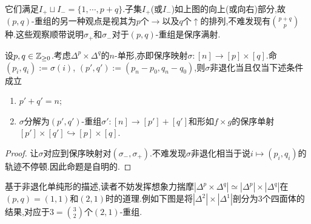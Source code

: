 它们满足$I_+ \sqcup I_- = \{1,\cdots,p+q\}$.子集$I_+$(或$I_-$)如上图的向上(或向右)部分,故$(p,q)$-重组的另一种观点是视其为$p$个$\to$以及$q$个$\uparrow$的排列,不难发现有${p+q}\choose{p}$种.这些观察顺带说明$\sigma_{+}$和$\sigma_{-}$对于$(p,q)$-重组是保序满射.
\begin{proposition}
    设$p,q\in \mathbb{Z}_{\geq 0}$.考虑$\Delta^p \times \Delta^q$的$n$-单形,亦即保序映射$\sigma : [n] \to [p]\times [q]$.命$(p_i,q_i):=\sigma(i)$, $(p',q'):= (p_n-p_0,q_n-q_0)$,则$\sigma$非退化当且仅当下述条件成立
    \begin{enumerate}
        \item $p'+q' = n$;
        \item $\sigma$分解为$(p',q')$-重组$\sigma' : [n] \to [p']+[q']$和形如$f\times g$的保序单射$[p']\times [q'] \hookrightarrow [p]\times [q]$.
    \end{enumerate}
\end{proposition}
\begin{proof}
    让$\sigma$对应到保序映射对$(\sigma_-,\sigma_+)$.不难发现$\sigma$非退化相当于说$i\mapsto (p_i,q_i)$的轨迹不停顿.因此命题是自明的.
\end{proof}
基于非退化单纯形的描述,读者不妨发挥想象力揣摩$|\Delta^p \times \Delta^q| \simeq |\Delta^p| \times |\Delta^q|$在$(p,q) =(1,1)$和$(2,1)$时的道理.例如下图是将$|\Delta^2 |\times |\Delta^1|$剖分为$3$个四面体的结果,对应于$3 = {3\choose 2}$个$(2,1)$-重组.

